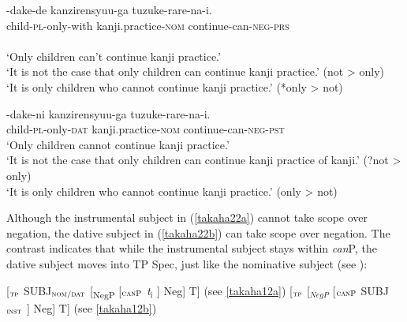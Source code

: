 \documentclass[output=paper]{langscibook}
\begin{document}
\begin{exe}
\ex \label{takaha22}
\begin{xlist}
\ex \label{takaha22a}
	-{dake-de} {kanzirensyuu-ga} {tuzuke-rare-na-i.}\\
	child-\textsc{pl}-only-with  kanji.practice-\textsc{nom} continue-can-\textsc{neg}-\textsc{prs}\\\\
	\glt `Only children can't continue kanji practice.’\\ 
	‘It is not the case that only children can continue kanji practice.’ (not \textgreater{} only)\\
	‘It is only children who cannot continue kanji practice.’ (*only \textgreater{} not)
    	
\ex \label{takaha22b}
	-{dake-ni} {kanzirensyuu-ga} {tuzuke-rare-na-i.}\\
	child-\textsc{pl}-only-\textsc{dat}       kanji.practice-\textsc{nom} continue-can-\textsc{neg}-\textsc{pst}\\
	\glt ‘Only children cannot continue kanji practice.’\\
	‘It is not the case that only children can continue kanji practice of kanji.’ (?not  \textgreater{} only)\\	           ‘It is only children who cannot continue kanji practice.’ (only \textgreater{} not)
\end{xlist}
\end{exe}

Although the instrumental subject in (\ref{takaha22a}) cannot take scope over negation, the dative subject in (\ref{takaha22b}) can take scope over negation. The contrast indicates that while the instrumental subject stays within \emph{can}P, the dative subject moves into TP Spec, just like the nominative subject (see \citealt{Ura1999, Kishimoto2010}):

\begin{exe}
\ex \label{takaha23}
\begin{xlist}
\ex \label{takaha23a}
	[$_{\textnormal{\textsc{tp}}}$ SUBJ$_{\textnormal{\textsc{nom/dat}}}$ \hspace{1mm} [\textsubscript{NegP} [$_{\textnormal{\textsc{canP}}}$ \hspace{8mm} \emph{t$_{\text{i}}$} \hspace{8mm}] Neg] T] (see \ref{takaha12a})
\ex \label{takaha23b}
	[$_{\textnormal{\textsc{tp}}}$ \hspace{22mm} [$_{NegP}$ [$_{\textnormal{\textsc{canP}}}$ \hspace{1mm} SUBJ$_{\textnormal{\textsc{inst}}}$ \hspace{2.6mm}] Neg] T] (see \ref{takaha12b})
\end{xlist}
\end{exe}
\end{document}
